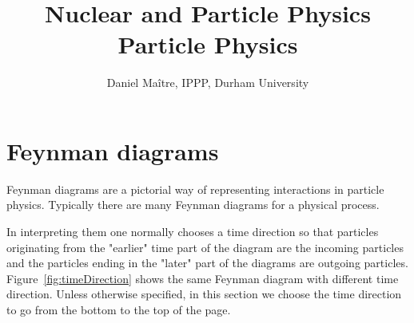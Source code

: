 \documentclass[12pt]{article}
\date{}
\title{\LARGE \bf Nuclear and Particle Physics\\[5mm]Particle Physics}
\author{Daniel Ma\^{i}tre, IPPP, Durham University}
\begin{document}
\maketitle
\section{Feynman diagrams}
Feynman diagrams are a pictorial way of representing interactions in particle physics. Typically there are many Feynman diagrams for a physical process. 

In interpreting them one normally chooses a time direction so that particles originating from the "earlier" time part of the diagram are the incoming particles and the particles ending in the "later" part of the diagrams are outgoing particles. 
Figure~\ref{fig:timeDirection} shows the same Feynman diagram with different time direction. Unless otherwise specified, in this section we choose the time direction to go from the bottom to the top of the page. 
\end{document}
